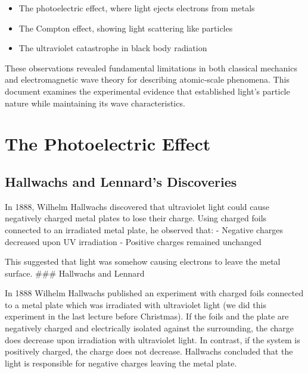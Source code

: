 \documentclass[
  a4paper,
]{book}
\providecommand{\tightlist}{%
  \setlength{\itemsep}{0pt}\setlength{\parskip}{0pt}}
\begin{document}
\begin{itemize}
\tightlist
\item
  The photoelectric effect, where light ejects electrons from metals
\item
  The Compton effect, showing light scattering like particles
\item
  The ultraviolet catastrophe in black body radiation
\end{itemize}

These observations revealed fundamental limitations in both classical
mechanics and electromagnetic wave theory for describing atomic-scale
phenomena. This document examines the experimental evidence that
established light's particle nature while maintaining its wave
characteristics.

\section{The Photoelectric Effect}\label{the-photoelectric-effect}

\subsection{Hallwachs and Lennard's
Discoveries}\label{hallwachs-and-lennards-discoveries}

In 1888, Wilhelm Hallwachs discovered that ultraviolet light could cause
negatively charged metal plates to lose their charge. Using charged
foils connected to an irradiated metal plate, he observed that: -
Negative charges decreased upon UV irradiation - Positive charges
remained unchanged

This suggested that light was somehow causing electrons to leave the
metal surface. \#\#\# Hallwachs and Lennard

In 1888 Wilhelm Hallwachs published an experiment with charged foils
connected to a metal plate which was irradiated with ultraviolet light
(we did this experiment in the last lecture before Christmas). If the
foils and the plate are negatively charged and electrically isolated
against the surrounding, the charge does decrease upon irradiation with
ultraviolet light. In contrast, if the system is positively charged, the
charge does not decrease. Hallwachs concluded that the light is
responsible for negative charges leaving the metal plate.
\end{document}
